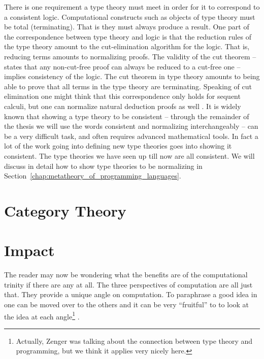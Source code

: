 There is one requirement a type theory must meet in order for it to
correspond to a consistent logic. Computational constructs such as
objects of type theory must be total (terminating).  That is they must
always produce a result.  One part of the correspondence between type
theory and logic is that the reduction rules of the type theory amount
to the cut-elimination algorithm for the logic.  That is, reducing
terms amounts to normalizing proofs.  The validity of the cut theorem
-- states that any non-cut-free proof can always be reduced to a
cut-free one -- implies consistency of the logic.  The cut theorem in
type theory amounts to being able to prove that all terms in the type
theory are terminating.  Speaking of cut elimination one might think
that this correspondence only holds for sequent calculi, but one can
normalize natural deduction proofs as well \cite{Prawitz:1965}.  It is
widely known that showing a type theory to be consistent -- through
the remainder of the thesis we will use the words consistent and
normalizing interchangeably -- can be a very difficult task, and often
requires advanced mathematical tools.  In
fact a lot of the work going into defining new type theories goes into
showing it consistent.  The type theories we have seen up till now are
all consistent.  We will discuss in detail how to show type theories
to be normalizing in
Section~\ref{chap:metatheory_of_programming_languages}.

\section{Category Theory}
\label{sec:tt_ct}


\section{Impact}
\label{sec:three_perspectives_programming_languages}
The reader may now be wondering what the benefits are of the computational
trinity if there are any at all.  The three
perspectives of computation are all just that.  They provide a unique
angle on computation. To paraphrase \cite{Zenger:1997} a good idea in
one can be moved over to the others and it can be very ``fruitful'' to
to look at the idea at each angle\footnote{Actually, Zenger was
  talking about the connection between type theory and programming,
  but we think it applies very nicely here.} .


